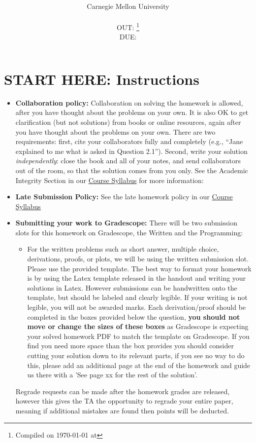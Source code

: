\documentclass{article}
\title{\textsc{\hwName}} %
\author{\courseName\\
  Carnegie Mellon University \\
\currentpiazza \\
OUT: \outDate{}\thanks{Compiled on \today{} at \currenttime{}} \\
DUE: \dueDate{} }
\date{}
\date{}
\numberwithin{equation}{section} %
\numberwithin{figure}{section} %
\numberwithin{table}{section} %
\begin{document}
\maketitle


\section*{START HERE: Instructions}
\begin{itemize}
\item \textbf{Collaboration policy:} Collaboration on solving the homework is allowed, after you have thought about the problems on your own. It is also OK to get clarification (but not solutions) from books or online resources, again after you have thought about the problems on your own. There are two requirements: first, cite your collaborators fully and completely (e.g., ``Jane explained to me what is asked in Question 2.1''). Second, write your solution {\em independently}: close the book and all of your notes, and send collaborators out of the room, so that the solution comes from you only.  See the Academic Integrity Section in our \href{\currentsyllabus}{Course Syllabus} for more information: 

\item\textbf{Late Submission Policy:} See the late homework policy in our \href{\currentsyllabus}{Course Syllabus}

\item\textbf{Submitting your work to Gradescope:} There will be two submission slots for this homework on Gradescope, the Written and the Programming:

\begin{itemize}

\item For the written problems such as short answer, multiple choice, derivations, proofs, or plots, we will be using the written submission slot. Please use the provided template. The best way to format your homework is by using the Latex template released in the handout and writing your solutions in Latex. However submissions can be handwritten onto the template, but should be labeled and clearly legible. If your writing is not legible, you will not be awarded marks.  Each derivation/proof should be  completed in the boxes provided below the question, \textbf{you should not move or change the sizes of these boxes} as Gradescope is expecting your solved homework PDF to match the template on Gradescope. If you find you need more space than the box provides you should consider cutting your solution down to its relevant parts, if you see no way to do this, please add an additional page at the end of the homework and guide us there with a 'See page xx for the rest of the solution'.

\end{itemize}
Regrade requests can be made after the homework grades are released, however this gives the TA the opportunity to regrade your entire paper, meaning if additional mistakes are found then points will be deducted. 
\end{itemize}
\end{document}
